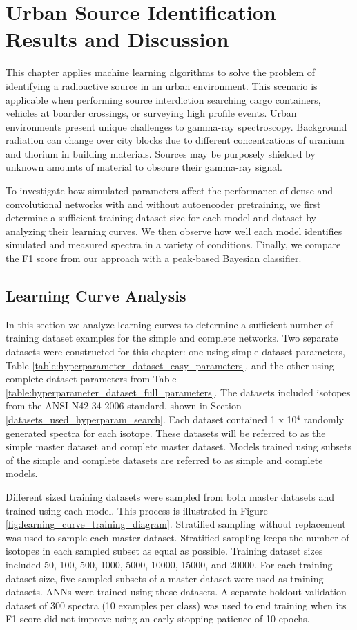 \chapter{Urban Source Identification Results and Discussion} \label{UrbanSourceIdentificationResultsandDiscussion}


This chapter applies machine learning algorithms to solve the problem of identifying a radioactive source in an urban environment. This scenario is applicable when performing source interdiction searching cargo containers, vehicles at boarder crossings, or surveying high profile events. Urban environments present unique challenges to gamma-ray spectroscopy. Background radiation can change over city blocks due to different concentrations of uranium and thorium in building materials. Sources may be purposely shielded by unknown amounts of material to obscure their gamma-ray signal. 

To investigate how simulated parameters affect the performance of dense and convolutional networks with and without autoencoder pretraining, we first determine a sufficient training dataset size for each model and dataset by analyzing their learning curves. We then observe how well each model identifies simulated and measured spectra in a variety of conditions. Finally, we compare the F1 score from our approach with a peak-based Bayesian classifier.

\section{Learning Curve Analysis} \label{sectionlearningcurve}

In this section we analyze learning curves to determine a sufficient number of training dataset examples for the simple and complete networks. Two separate datasets were constructed for this chapter: one using simple dataset parameters, Table \ref{table:hyperparameter_dataset_easy_parameters}, and the other using complete dataset parameters from Table \ref{table:hyperparameter_dataset_full_parameters}. The datasets included isotopes from the ANSI N42-34-2006 standard, shown in Section \ref{datasets_used_hyperparam_search}. Each dataset contained 1 x 10$^{4}$ randomly generated spectra for each isotope. These datasets will be referred to as the simple master dataset and complete master dataset. Models trained using subsets of the simple and complete datasets are referred to as simple and complete models.

Different sized training datasets were sampled from both master datasets and trained using each model. This process is illustrated in Figure \ref{fig:learning_curve_training_diagram}. Stratified sampling without replacement was used to sample each master dataset. Stratified sampling keeps the number of isotopes in each sampled subset as equal as possible. Training dataset sizes included 50, 100, 500, 1000, 5000, 10000, 15000, and 20000. For each training dataset size, five sampled subsets of a master dataset were used as training datasets. ANNs were trained using these datasets. A separate holdout validation dataset of 300 spectra (10 examples per class) was used to end training when its F1 score did not improve using an early stopping patience of 10 epochs.

